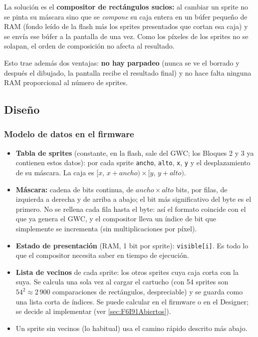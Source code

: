 La solución es el \textbf{compositor de rectángulos sucios:} al cambiar un sprite no se pinta su máscara sino que se \emph{compone} su caja entera en un búfer pequeño de RAM (fondo leído de la flash más los sprites presentados que cortan esa caja) y se envía ese búfer a la pantalla de una vez. Como los píxeles de los sprites no se solapan, el orden de composición no afecta al resultado.

Esto trae además dos ventajas: \textbf{no hay parpadeo} (nunca se ve el borrado y después el dibujado, la pantalla recibe el resultado final) y no hace falta ninguna RAM proporcional al número de sprites.

\subsection{Diseño}
\label{sec:F6I91Diseno}

\subsubsection{Modelo de datos en el firmware}

\begin{itemize}
	\item \textbf{Tabla de sprites} (constante, en la flash, sale del GWC; los Bloques 2 y 3 ya contienen estos datos): por cada sprite \texttt{ancho}, \texttt{alto}, \texttt{x}, \texttt{y} y el desplazamiento de su máscara. La caja es $[x,\,x+ancho)\times[y,\,y+alto)$.
	\item \textbf{Máscara:} cadena de bits continua, de $ancho\times alto$ bits, por filas, de izquierda a derecha y de arriba a abajo; el bit más significativo del byte es el primero. No se rellena cada fila hasta el byte: así el formato coincide con el que ya genera el GWC, y el compositor lleva un índice de bit que simplemente se incrementa (sin multiplicaciones por píxel).
	\item \textbf{Estado de presentación} (RAM, 1 bit por sprite): \texttt{visible[i]}. Es todo lo que el compositor necesita saber en tiempo de ejecución.
	\item \textbf{Lista de vecinos} de cada sprite: los otros sprites cuya caja corta con la suya. Se calcula una sola vez al cargar el cartucho (con 54 sprites son $54^2\approx 2\,900$ comparaciones de rectángulos, despreciable) y se guarda como una lista corta de índices. Se puede calcular en el firmware o en el Designer; se decide al implementar (ver \ref{sec:F6I91Abiertos}).
	\item Un sprite sin vecinos (lo habitual) usa el camino rápido descrito más abajo.
\end{itemize}

